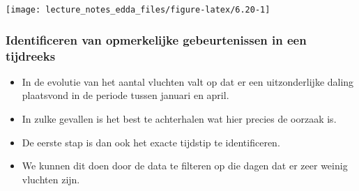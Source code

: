 \documentclass[]{memoir}
\newenvironment{Shaded}{\begin{snugshade}}{\end{snugshade}}
\newcommand{\KeywordTok}[1]{\textcolor[rgb]{0.13,0.29,0.53}{\textbf{#1}}}
\newcommand{\DataTypeTok}[1]{\textcolor[rgb]{0.13,0.29,0.53}{#1}}
\newcommand{\DecValTok}[1]{\textcolor[rgb]{0.00,0.00,0.81}{#1}}
\newcommand{\StringTok}[1]{\textcolor[rgb]{0.31,0.60,0.02}{#1}}
\newcommand{\OperatorTok}[1]{\textcolor[rgb]{0.81,0.36,0.00}{\textbf{#1}}}
\newcommand{\NormalTok}[1]{#1}
\providecommand{\tightlist}{%
  \setlength{\itemsep}{0pt}\setlength{\parskip}{0pt}}
\begin{document}
\begin{Shaded}
\end{Shaded}

\texttt{[image: lecture\_notes\_edda\_files/figure-latex/6.20-1]}

\subsubsection{Identificeren van opmerkelijke gebeurtenissen in een
tijdreeks}\label{identificeren-van-opmerkelijke-gebeurtenissen-in-een-tijdreeks}

\begin{itemize}
\tightlist
\item
  In de evolutie van het aantal vluchten valt op dat er een
  uitzonderlijke daling plaatsvond in de periode tussen januari en
  april.
\item
  In zulke gevallen is het best te achterhalen wat hier precies de
  oorzaak is.
\item
  De eerste stap is dan ook het exacte tijdstip te identificeren.
\item
  We kunnen dit doen door de data te filteren op die dagen dat er zeer
  weinig vluchten zijn.
\end{itemize}

\begin{Shaded}
\end{Shaded}
\end{document}
